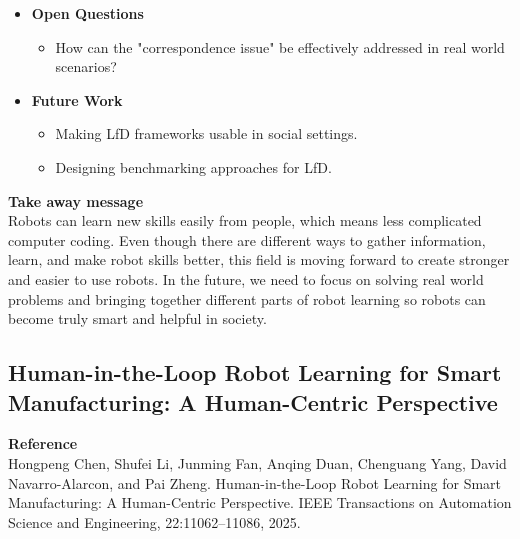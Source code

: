 \documentclass[report.tex]{subfiles}
\begin{document}
\begin{itemize}
    \item \noindent\textbf {Open Questions}
    \begin{itemize}
        \item     How can the "correspondence issue" be effectively addressed in real world scenarios?


    \end{itemize}
    
    \item \noindent\textbf{Future Work}
    \begin{itemize}
        \item Making LfD frameworks usable in social settings.
        \item Designing benchmarking approaches for LfD.
        
    \end{itemize}
\end{itemize}


\noindent\textbf{Take away message}  \\
Robots can learn new skills easily from people, which means less complicated computer coding. Even though there are different ways to gather information, learn, and make robot skills better, this field is moving forward to create stronger and easier to use robots. In the future, we need to focus on solving real world problems and bringing together different parts of robot learning so robots can become truly smart and helpful in society.















\subsection{Human-in-the-Loop Robot Learning for Smart  Manufacturing: A Human-Centric Perspective} 

\noindent\textbf{Reference} \\
\cite{chen_human---loop_2025}Hongpeng Chen, Shufei Li, Junming Fan, Anqing Duan, Chenguang Yang, David Navarro-Alarcon,
and Pai Zheng. Human-in-the-Loop Robot Learning for Smart Manufacturing: A Human-Centric
Perspective. IEEE Transactions on Automation Science and Engineering, 22:11062–11086, 2025.\\
\end{document}
